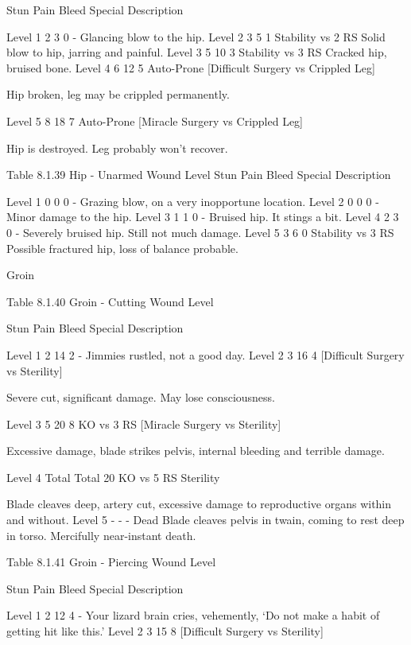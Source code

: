 \documentclass[oneside,11pt,english]{book}
\begin{document}
Stun Pain Bleed Special Description 

Level 1 2 3 0 - Glancing blow to the hip. 
Level 2 3 5 1 Stability vs 2 RS Solid blow to hip, jarring and painful. 
Level 3 5 10 3 Stability vs 3 RS Cracked hip, bruised bone. 
Level 4 6 12 5 Auto-Prone [Difficult Surgery vs 
Crippled Leg] 

Hip broken, leg may be crippled 
permanently. 

Level 5 8 18 7 Auto-Prone [Miracle Surgery vs 
Crippled Leg] 

Hip is destroyed. Leg probably won’t 
recover. 

 
Table 8.1.39 Hip - Unarmed 
Wound Level Stun Pain Bleed Special Description 


Level 1 0 0 0 - Grazing blow, on a very inopportune location. 
Level 2 0 0 0 - Minor damage to the hip. 
Level 3 1 1 0 - Bruised hip. It stings a bit. 
Level 4 2 3 0 - Severely bruised hip. Still not much damage. 
Level 5 3 6 0 Stability vs 3 RS Possible fractured hip, loss of balance probable. 

 

 

 


Groin 

 

Table 8.1.40 Groin - Cutting 
Wound 
Level 

Stun Pain Bleed Special Description 

Level 1 2 14 2 - Jimmies rustled, not a good day. 
Level 2 3 16 4 [Difficult Surgery 
vs Sterility] 

Severe cut, significant damage. May lose 
consciousness. 

Level 3 5 20 8 KO vs 3 RS 
[Miracle Surgery vs 
Sterility] 

Excessive damage, blade strikes pelvis, internal 
bleeding and terrible damage. 

Level 4 Total Total 20 KO vs 5 RS 
Sterility 

Blade cleaves deep, artery cut, excessive damage to 
reproductive organs within and without. 
Level 5 - - - Dead Blade cleaves pelvis in twain, coming to rest deep in 
torso. Mercifully near-instant death. 

 
Table 8.1.41 Groin - Piercing 
Wound 
Level 

Stun Pain Bleed Special Description 

Level 1 2 12 4 - Your lizard brain cries, vehemently, ‘Do not make a habit of 
getting hit like this.’ 
Level 2 3 15 8 [Difficult 
Surgery vs 
Sterility] 
\end{document}
